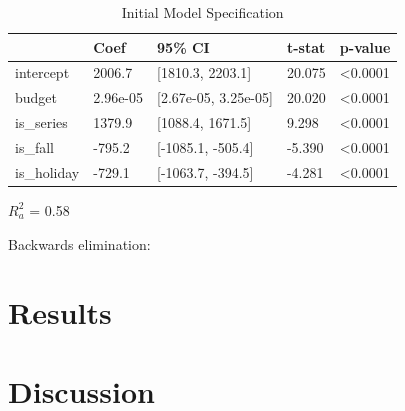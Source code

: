 \documentclass[10pt]{article}
\begin{document}
\begin{table}[H]
  \begin{threeparttable}
    \caption{Initial Model Specification}
       \begin{tabular}{|l l l l l|} 
	 \hline
	 & Coef & 95\% CI & t-stat & p-value \\ [0.5ex] 
	 \hline
	intercept & 2006.7 & [1810.3, 2203.1] & 20.075 & <0.0001 \\ 
	\hline
	budget & 2.96e-05 & [2.67e-05, 3.25e-05] & 20.020 & <0.0001\\
	 \hline
	is\_series & 1379.9 & [1088.4, 1671.5] & 9.298 & <0.0001\\
	\hline
	is\_fall & -795.2 & [-1085.1, -505.4] & -5.390 & <0.0001\\
	\hline
	is\_holiday & -729.1 & [-1063.7, -394.5] & -4.281 & <0.0001\\[1ex]
	\hline
      \end{tabular}
    \begin{tablenotes}
      \small
      \item $R^2_a$ = 0.58
    \end{tablenotes}  
  \end{threeparttable}    
\end{table}

Backwards elimination:


\section{Results}

\section{Discussion}

 
%

\appendix
\end{document}
